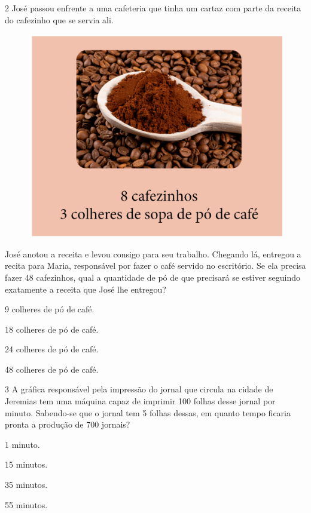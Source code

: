 \num{2} José passou enfrente a uma cafeteria que tinha um cartaz com parte
da receita do cafezinho que se servia ali.

\begin{figure}[htpb!]
\centering
\includegraphics[width=.4\textwidth]{../ilustracoes/MAT5/SAEB_5ANO_MAT_figura80.png}
\end{figure}

José anotou a receita e levou consigo para seu trabalho. Chegando lá,
entregou a recita para Maria, responsável por fazer o café servido no
escritório. Se ela precisa fazer 48 cafezinhos, qual a
quantidade de pó de que precisará se estiver seguindo exatamente a receita que José lhe entregou?

\begin{minipage}{.5\textwidth}
\begin{escolha}
\item
  9 colheres de pó de café.
\item
  18 colheres de pó de café.
\item
  24 colheres de pó de café.
\item
  48 colheres de pó de café.
\end{escolha}
\end{minipage}

\num{3} A gráfica responsável pela impressão do jornal que circula na
cidade de Jeremias tem uma máquina capaz de imprimir 100 folhas desse jornal por minuto. Sabendo-se que o jornal tem 5 folhas dessas, em
quanto tempo ficaria pronta a produção de 700 jornais?

\begin{minipage}{.5\textwidth}
\begin{escolha}
\item
  1 minuto.
\item
  15 minutos.
\item
  35 minutos.
\item
  55 minutos.
\end{escolha}
\end{minipage}


